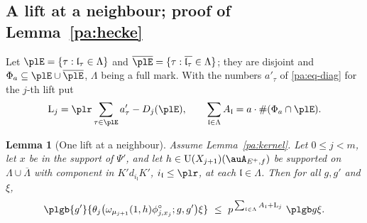 \documentclass[10pt]{amsart}
\newtheorem{lemma}[theorem]{Lemma}
\theoremstyle{definition}
\theoremstyle{remark}
\providecommand{\auPa}{\Phi_a}
\providecommand{\auU}{\mathrm U}
\providecommand{\aubar}[1]{\overline{#1}}
\begin{document}
\subsection{A lift at a neighbour; proof of Lemma~\ref{pa:hecke}}\label{pl:ss-hecke}
Let $\plE=\{\tau:\mathfrak l_\tau\in\Lambda\}$ and $\aubar\plE=\{\tau:\aubar{\mathfrak l_\tau}\in
\Lambda\}$; they are disjoint and $\Phi_a\subseteq\plE\cup\aubar\plE$, $\Lambda$ being a full
mark. With the numbers $a'_\tau$ of \eqref{pa:eq-diag} for the $j$-th lift put
\[
\mathrm L_j=\plr\sum_{\tau\in\plE}a'_\tau-D_j(\plE),\qquad\sum_{\mathfrak l\in\Lambda}A_{\mathfrak l}=a\cdot
\#(\auPa\cap\plE).
\]

\begin{lemma}[One lift at a neighbour]\label{pl:neigh}
Assume Lemma~\ref{pa:kernel}. Let $0\le j<m$, let $x$ be in the support of $\Psi'$, and let $h\in
\auU(X_{j+1})(\auA_{E^+,f})$ be supported on $\Lambda\cup\aubar\Lambda$ with component in
$K'd_{i_{\mathfrak l}}K'$, $i_{\mathfrak l}\le\plr$, at each $\mathfrak l\in\Lambda$. Then for all
$g,g'$ and $\xi$,
\[
\plgb{g'}{\theta_j\bigl(\omega_{\mu_{j+1}}(1,h)\phi^\circ_{j,x_j};g,g'\bigr)\xi}\ \le\ p^{\,\sum_{
\mathfrak l\in\Lambda}A_{\mathfrak l}+\mathrm L_j}\ \plgb g\xi .
\]
\end{lemma}
\end{document}
